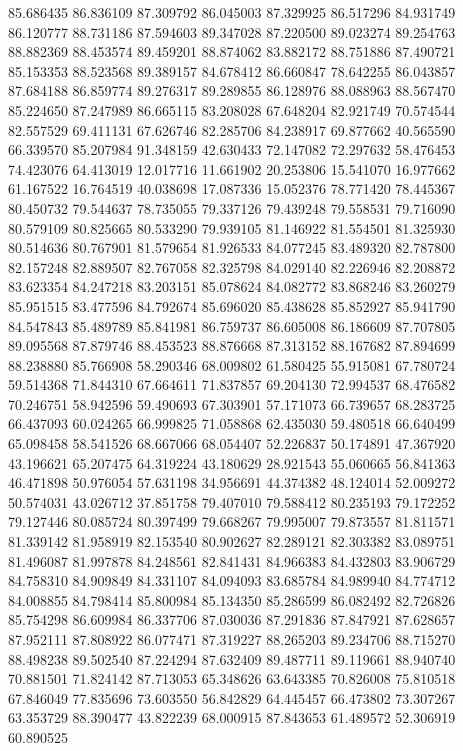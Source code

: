 85.686435
86.836109
87.309792
86.045003
87.329925
86.517296
84.931749
86.120777
88.731186
87.594603
89.347028
87.220500
89.023274
89.254763
88.882369
88.453574
89.459201
88.874062
83.882172
88.751886
87.490721
85.153353
88.523568
89.389157
84.678412
86.660847
78.642255
86.043857
87.684188
86.859774
89.276317
89.289855
86.128976
88.088963
88.567470
85.224650
87.247989
86.665115
83.208028
67.648204
82.921749
70.574544
82.557529
69.411131
67.626746
82.285706
84.238917
69.877662
40.565590
66.339570
85.207984
91.348159
42.630433
72.147082
72.297632
58.476453
74.423076
64.413019
12.017716
11.661902
20.253806
15.541070
16.977662
61.167522
16.764519
40.038698
17.087336
15.052376
78.771420
78.445367
80.450732
79.544637
78.735055
79.337126
79.439248
79.558531
79.716090
80.579109
80.825665
80.533290
79.939105
81.146922
81.554501
81.325930
80.514636
80.767901
81.579654
81.926533
84.077245
83.489320
82.787800
82.157248
82.889507
82.767058
82.325798
84.029140
82.226946
82.208872
83.623354
84.247218
83.203151
85.078624
84.082772
83.868246
83.260279
85.951515
83.477596
84.792674
85.696020
85.438628
85.852927
85.941790
84.547843
85.489789
85.841981
86.759737
86.605008
86.186609
87.707805
89.095568
87.879746
88.453523
88.876668
87.313152
88.167682
87.894699
88.238880
85.766908
58.290346
68.009802
61.580425
55.915081
67.780724
59.514368
71.844310
67.664611
71.837857
69.204130
72.994537
68.476582
70.246751
58.942596
59.490693
67.303901
57.171073
66.739657
68.283725
66.437093
60.024265
66.999825
71.058868
62.435030
59.480518
66.640499
65.098458
58.541526
68.667066
68.054407
52.226837
50.174891
47.367920
43.196621
65.207475
64.319224
43.180629
28.921543
55.060665
56.841363
46.471898
50.976054
57.631198
34.956691
44.374382
48.124014
52.009272
50.574031
43.026712
37.851758
79.407010
79.588412
80.235193
79.172252
79.127446
80.085724
80.397499
79.668267
79.995007
79.873557
81.811571
81.339142
81.958919
82.153540
80.902627
82.289121
82.303382
83.089751
81.496087
81.997878
84.248561
82.841431
84.966383
84.432803
83.906729
84.758310
84.909849
84.331107
84.094093
83.685784
84.989940
84.774712
84.008855
84.798414
85.800984
85.134350
85.286599
86.082492
82.726826
85.754298
86.609984
86.337706
87.030036
87.291836
87.847921
87.628657
87.952111
87.808922
86.077471
87.319227
88.265203
89.234706
88.715270
88.498238
89.502540
87.224294
87.632409
89.487711
89.119661
88.940740
70.881501
71.824142
87.713053
65.348626
63.643385
70.826008
75.810518
67.846049
77.835696
73.603550
56.842829
64.445457
66.473802
73.307267
63.353729
88.390477
43.822239
68.000915
87.843653
61.489572
52.306919
60.890525
